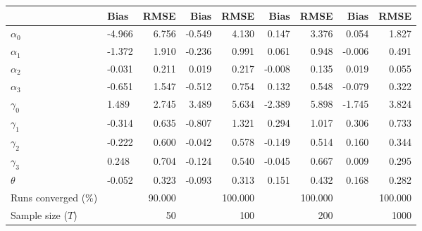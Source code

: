 
\begin{tabular}[t]{llrrrrrrr}
\toprule
  & Bias & RMSE & Bias & RMSE & Bias & RMSE & Bias & RMSE\\
\midrule
$\alpha_{0}$ & -4.966 & 6.756 & -0.549 & 4.130 & 0.147 & 3.376 & 0.054 & 1.827\\
$\alpha_{1}$ & -1.372 & 1.910 & -0.236 & 0.991 & 0.061 & 0.948 & -0.006 & 0.491\\
$\alpha_{2}$ & -0.031 & 0.211 & 0.019 & 0.217 & -0.008 & 0.135 & 0.019 & 0.055\\
$\alpha_{3}$ & -0.651 & 1.547 & -0.512 & 0.754 & 0.132 & 0.548 & -0.079 & 0.322\\
$\gamma_{0}$ & 1.489 & 2.745 & 3.489 & 5.634 & -2.389 & 5.898 & -1.745 & 3.824\\
$\gamma_{1}$ & -0.314 & 0.635 & -0.807 & 1.321 & 0.294 & 1.017 & 0.306 & 0.733\\
$\gamma_{2}$ & -0.222 & 0.600 & -0.042 & 0.578 & -0.149 & 0.514 & 0.160 & 0.344\\
$\gamma_{3}$ & 0.248 & 0.704 & -0.124 & 0.540 & -0.045 & 0.667 & 0.009 & 0.295\\
$\theta$ & -0.052 & 0.323 & -0.093 & 0.313 & 0.151 & 0.432 & 0.168 & 0.282\\
Runs converged (\%) &  & 90.000 &  & 100.000 &  & 100.000 &  & 100.000\\
Sample size ($T$) &  & 50 &  & 100 &  & 200 &  & 1000\\
\bottomrule
\end{tabular}
